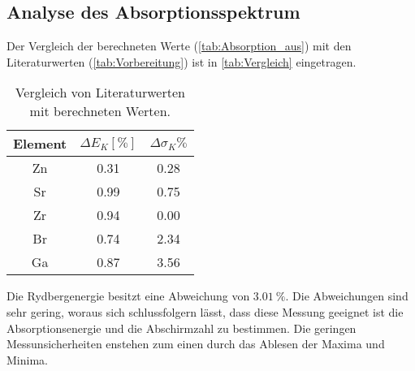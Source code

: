 \subsection{Analyse des Absorptionsspektrum} %
\label{sub:Absorption_durch}
Der Vergleich der berechneten Werte (\ref{tab:Absorption_aus}) mit den Literaturwerten (\ref{tab:Vorbereitung}) ist in \autoref{tab:Vergleich} eingetragen.
\begin{table}[H]
    \centering
    \caption{Vergleich von Literaturwerten mit berechneten Werten.}
    \label{tab:Vergleich}
    \begin{tabular}{c S S }
    \toprule
    {Element} & {$\Delta E_{K} [\si{\percent}]$}& {$\Delta\sigma_K \si{\percent}$}\\
    \midrule
      Zn & 0.31 & 0.28 \\
      Sr & 0.99 & 0.75 \\
      Zr & 0.94 & 0.00 \\
      Br & 0.74 & 2.34 \\
      Ga & 0.87 & 3.56 \\ 
    \bottomrule
    \end{tabular}
  \end{table}
Die Rydbergenergie besitzt eine Abweichung von $\qty{3.01}{\percent}$.
Die Abweichungen sind sehr gering, woraus sich schlussfolgern lässt, dass diese
Messung geeignet ist die Absorptionsenergie und die Abschirmzahl zu bestimmen.
Die geringen Messunsicherheiten enstehen zum einen durch das Ablesen der Maxima und Minima. 
